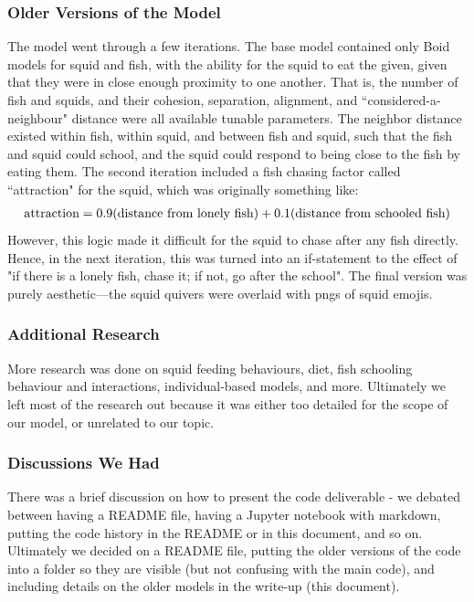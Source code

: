 \documentclass[12pt]{article}
\begin{document}
\subsubsection{Older Versions of the Model}
The model went through a few iterations. The base model contained only Boid models for squid and fish, with the ability for the squid to eat the given, given that they were in close enough proximity to one another. That is, the number of fish and squids, and their cohesion, separation, alignment, and ``considered-a-neighbour" distance were all available tunable parameters. The neighbor distance existed within fish, within squid, and between fish and squid, such that the fish and squid could school, and the squid could respond to being close to the fish by eating them. The second iteration included a fish chasing factor called ``attraction" for the squid, which was originally something like:
\begin{align*}
    \textnormal{attraction} = 0.9 (\textnormal{distance from lonely fish}) + 0.1( \textnormal{distance from schooled fish})
\end{align*}
However, this logic made it difficult for the squid to chase after any fish directly. Hence, in the next iteration, this was turned into an if-statement to the effect of "if there is a lonely fish, chase it; if not, go after the school". The final version was purely aesthetic---the squid quivers were overlaid with pngs of squid emojis.
\subsubsection{Additional Research}
More research was done on squid feeding behaviours, diet, fish schooling behaviour and interactions, individual-based models, and more. Ultimately we left most of the research out because it was either too detailed for the scope of our model, or unrelated to our topic. 

\subsubsection{Discussions We Had}
There was a brief discussion on how to present the code deliverable - we debated between having a README file, having a Jupyter notebook with markdown, putting the code history in the README or in this document, and so on. Ultimately we decided on a README file, putting the older versions of the code into a folder so they are visible (but not confusing with the main code), and including details on the older models in the write-up (this document).
\end{document}

